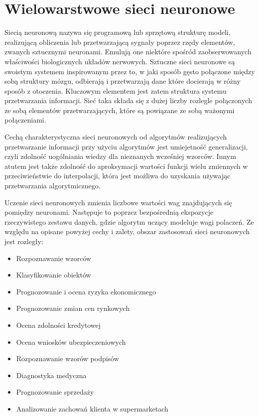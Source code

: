 \documentclass[brudnopis]{xmgr}
\begin{document}
\section{Wielowarstwowe sieci neuronowe}

Siecią neuronową nazywa się programową lub sprzętową strukturę modeli, realizującą obliczenia lub przetwarzającą sygnały poprzez rzędy elementów, zwanych sztucznymi neuronami. Emulują one niektóre spośród zaobserwowanych właściwości biologicznych układów nerwowych. Sztuczne sieci neuronowe są swoistym systemem inspirowanym przez to, w jaki sposób gęsto połączone między sobą struktury mózgu, odbierają i przetwarzają dane które docierają w różny sposób z otoczenia. Kluczowym elementem jest zatem struktura systemu przetwarzania informacji. Sieć taka składa się z dużej liczby rozlegle połączonych ze sobą elementów przetwarzających, które są powiązane ze sobą ważonymi połączeniami.

Cechą charakterystyczna sieci neuronowych od algorytmów realizujących przetwarzanie informacji przy użyciu algorytmów jest umiejetność generalizacji, czyli zdolność uogólniania wiedzy dla nieznanych wcześniej wzorców. Innym atutem jest także zdolność do aproksymacji wartości funkcji wielu zmiennych w przeciwieństwie do interpolacji, która jest możliwa do uzyskania używając przetwarzania algorytmicznego.

Uczenie sieci neuronowych zmienia liczbowe wartości wag znajdujących się pomiędzy neuronami. Następuje to poprzez bezpośrednią ekspozycje rzeczywistego zestawu danych, gdzie algorytm uczący modeluje wagi polaczeń. Ze względu na opisane powyżej cechy i zalety, obszar zastosowań sieci neuronowych jest rozległy:

\begin{itemize}
\item
Rozpoznawanie wzorców
\item
Klasyfikowanie obiektów
\item
Prognozowanie i ocena ryzyka ekonomicznego
\item
Prognozowanie zmian cen rynkowych
\item
Ocena zdolności kredytowej
\item
Ocena wniosków ubezpieczeniowych
\item
Rozpoznawanie wzorów podpisów
\item
Diagnostyka medyczna
\item
Prognozowanie sprzedaży
\item
Analizowanie zachowań klienta w supermarketach
\end{itemize}
\end{document}
